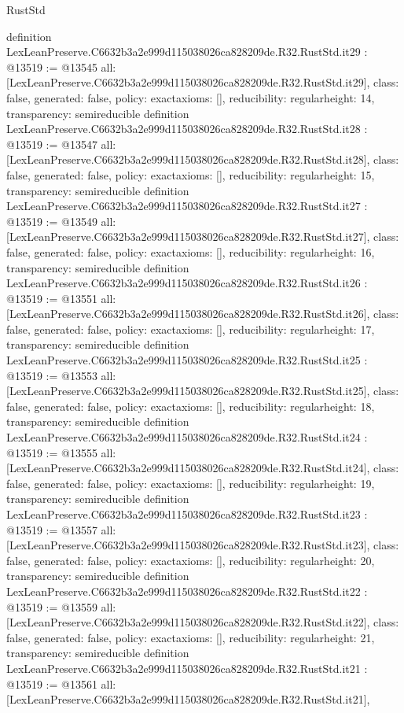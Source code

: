 \begin{lexlean}{RustStd}
\begin{coremodule}
{}
definition LexLeanPreserve.C6632b3a2e999d115038026ca828209de.R32.RustStd.it29 : @13519 := @13545 {
  all: [LexLeanPreserve.C6632b3a2e999d115038026ca828209de.R32.RustStd.it29],
  class: false,
  generated: false,
  policy: exact{axioms: []},
  reducibility: regular{height: 14},
  transparency: semireducible
}
definition LexLeanPreserve.C6632b3a2e999d115038026ca828209de.R32.RustStd.it28 : @13519 := @13547 {
  all: [LexLeanPreserve.C6632b3a2e999d115038026ca828209de.R32.RustStd.it28],
  class: false,
  generated: false,
  policy: exact{axioms: []},
  reducibility: regular{height: 15},
  transparency: semireducible
}
definition LexLeanPreserve.C6632b3a2e999d115038026ca828209de.R32.RustStd.it27 : @13519 := @13549 {
  all: [LexLeanPreserve.C6632b3a2e999d115038026ca828209de.R32.RustStd.it27],
  class: false,
  generated: false,
  policy: exact{axioms: []},
  reducibility: regular{height: 16},
  transparency: semireducible
}
definition LexLeanPreserve.C6632b3a2e999d115038026ca828209de.R32.RustStd.it26 : @13519 := @13551 {
  all: [LexLeanPreserve.C6632b3a2e999d115038026ca828209de.R32.RustStd.it26],
  class: false,
  generated: false,
  policy: exact{axioms: []},
  reducibility: regular{height: 17},
  transparency: semireducible
}
definition LexLeanPreserve.C6632b3a2e999d115038026ca828209de.R32.RustStd.it25 : @13519 := @13553 {
  all: [LexLeanPreserve.C6632b3a2e999d115038026ca828209de.R32.RustStd.it25],
  class: false,
  generated: false,
  policy: exact{axioms: []},
  reducibility: regular{height: 18},
  transparency: semireducible
}
definition LexLeanPreserve.C6632b3a2e999d115038026ca828209de.R32.RustStd.it24 : @13519 := @13555 {
  all: [LexLeanPreserve.C6632b3a2e999d115038026ca828209de.R32.RustStd.it24],
  class: false,
  generated: false,
  policy: exact{axioms: []},
  reducibility: regular{height: 19},
  transparency: semireducible
}
definition LexLeanPreserve.C6632b3a2e999d115038026ca828209de.R32.RustStd.it23 : @13519 := @13557 {
  all: [LexLeanPreserve.C6632b3a2e999d115038026ca828209de.R32.RustStd.it23],
  class: false,
  generated: false,
  policy: exact{axioms: []},
  reducibility: regular{height: 20},
  transparency: semireducible
}
definition LexLeanPreserve.C6632b3a2e999d115038026ca828209de.R32.RustStd.it22 : @13519 := @13559 {
  all: [LexLeanPreserve.C6632b3a2e999d115038026ca828209de.R32.RustStd.it22],
  class: false,
  generated: false,
  policy: exact{axioms: []},
  reducibility: regular{height: 21},
  transparency: semireducible
}
definition LexLeanPreserve.C6632b3a2e999d115038026ca828209de.R32.RustStd.it21 : @13519 := @13561 {
  all: [LexLeanPreserve.C6632b3a2e999d115038026ca828209de.R32.RustStd.it21],
}
\end{coremodule}
\end{lexlean}
